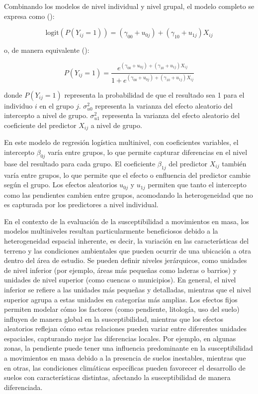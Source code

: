 \documentclass[
  manuscript=article,  
  layout=preprint,  
]{format}
\begin{document}
Combinando los modelos de nivel individual y nivel grupal, el modelo completo se expresa como (\cite{lee1996hierarchical}):

\[
\text{logit}(P(Y_{ij} = 1)) = (\gamma_{00} + u_{0j}) + (\gamma_{10} + u_{1j}) X_{ij}
\]

o, de manera equivalente (\cite{wong1985hierarchical}):

\[
P(Y_{ij} = 1) = \frac{e^{(\gamma_{00} + u_{0j}) + (\gamma_{10} + u_{1j}) X_{ij}}}{1 + e^{(\gamma_{00} + u_{0j}) + (\gamma_{10} + u_{1j}) X_{ij}}}
\]

donde $P(Y_{ij} = 1)$ representa la probabilidad de que el resultado sea 1 para el individuo $i$ en el grupo $j$. $\sigma^2_{u0}$ representa la varianza del efecto aleatorio del intercepto a nivel de grupo. $\sigma^2_{u1}$ representa la varianza del efecto aleatorio del coeficiente del predictor $X_{ij}$ a nivel de grupo.

En este modelo de regresión logística multinivel, con coeficientes variables, el intercepto $\beta_{0j}$ varía entre grupos, lo que permite capturar diferencias en el nivel base del resultado para cada grupo. El coeficiente $\beta_{1j}$ del predictor $X_{ij}$ también varía entre grupos, lo que permite que el efecto o enfluencia del predictor cambie según el grupo. Los efectos aleatorios $u_{0j}$ y $u_{1j}$ permiten que tanto el intercepto como las pendientes cambien entre grupos, acomodando la heterogeneidad que no es capturada por los predictores a nivel individual.

En el contexto de la evaluación de la susceptibilidad a movimientos en masa, los modelos multiniveles resultan particularmente beneficiosos debido a la heterogeneidad espacial inherente, es decir, la variación en las características del terreno y las condiciones ambientales que pueden ocurrir de una ubicación a otra dentro del área de estudio. Se pueden definir niveles jerárquicos, como unidades de nivel inferior (por ejemplo, áreas más pequeñas como laderas o barrios) y unidades de nivel superior (como cuencas o municipios). En general, el nivel inferior se refiere a las unidades más pequeñas y detalladas, mientras que el nivel superior agrupa a estas unidades en categorías más amplias. Los efectos fijos permiten modelar cómo los factores (como pendiente, litología, uso del suelo) influyen de manera global en la susceptibilidad, mientras que los efectos aleatorios reflejan cómo estas relaciones pueden variar entre diferentes unidades espaciales, capturando mejor las diferencias locales. Por ejemplo, en algunas zonas, la pendiente puede tener una influencia predominante en la susceptibilidad a movimientos en masa debido a la presencia de suelos inestables, mientras que en otras, las condiciones climáticas específicas pueden favorecer el desarrollo de suelos con características distintas, afectando la susceptibilidad de manera diferenciada.
\end{document}
